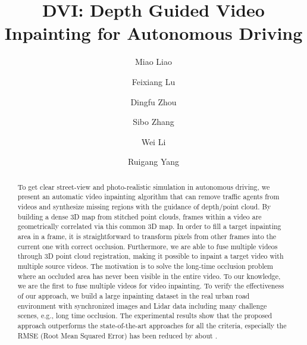 \documentclass[runningheads]{llncs}
\begin{document}
\pagestyle{headings}
\mainmatter
\def\ECCVSubNumber{100}  

\title{DVI: Depth Guided Video Inpainting for Autonomous Driving} 

\begin{comment}
\titlerunning{ECCV-20 submission ID \ECCVSubNumber} 
\authorrunning{ECCV-20 submission ID \ECCVSubNumber} 
\author{Anonymous ECCV submission}
\institute{Paper ID \ECCVSubNumber}
\end{comment}


\author{Miao Liao \and
Feixiang Lu \and
Dingfu Zhou \and
Sibo Zhang \and
Wei Li \and
Ruigang Yang}
\maketitle

\begin{abstract}
To get clear street-view and photo-realistic simulation in autonomous driving, we present an automatic video inpainting algorithm that can remove traffic agents from videos and synthesize missing regions with the guidance of depth/point cloud. By building a dense 3D map from stitched point clouds, frames within a video are geometrically correlated via this common 3D map. In order to fill a target inpainting area in a frame, it is straightforward to transform pixels from other frames into the current one with correct occlusion. Furthermore, we are able to fuse multiple videos through 3D point cloud registration, making it possible to inpaint a target video with multiple source videos. The motivation is to solve the long-time occlusion problem where an occluded area has never been visible in the entire video. To our knowledge, we are the first to fuse multiple videos for video inpainting. To verify the effectiveness of our approach, we build a large inpainting dataset in the real urban road environment with synchronized images and Lidar data including many challenge scenes, e.g., long time occlusion. The experimental results show that the proposed approach outperforms the state-of-the-art approaches for all the criteria, especially the RMSE (Root Mean Squared Error) has been reduced by about .
\end{abstract}
\end{document}
